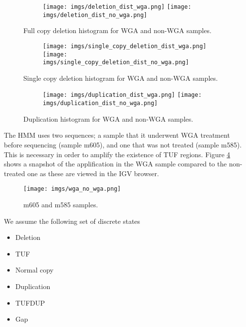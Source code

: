 \begin{figure}[h]
	\begin{subfigure}{}
		\texttt{[image: imgs/deletion\_dist\_wga.png]}
		\texttt{[image: imgs/deletion\_dist\_no\_wga.png]}	
	\end{subfigure}
	
	\caption{Full copy deletion histogram for WGA and non-WGA samples.  }
	\label{fig:image1}
\end{figure}


\begin{figure}[h]
	\begin{subfigure}{}
		\texttt{[image: imgs/single\_copy\_deletion\_dist\_wga.png]}
		\texttt{[image: imgs/single\_copy\_deletion\_dist\_no\_wga.png]}	
	\end{subfigure}
	
	\caption{Single copy deletion histogram for WGA and non-WGA samples.  }
	\label{fig:image2}
\end{figure}


\begin{figure}[h]
	\begin{subfigure}{}
		\texttt{[image: imgs/duplication\_dist\_wga.png]}
		\texttt{[image: imgs/duplication\_dist\_no\_wga.png]}	
	\end{subfigure}
	
	\caption{Duplication histogram for WGA and non-WGA samples.  }
	\label{fig:image3}
\end{figure}


The HMM uses two sequences; a sample that it underwent WGA treatment before sequencing (sample  m605), and  one that was not treated (sample m585). 
This is necessary in order to amplify the existence of TUF regions. 
Figure \ref{wga_no_wga } shows a snapshot of the applification in the WGA sample compared to the non-treated one as these are viewed in the IGV browser.


\begin{figure}[!htb]
	\begin{center}
		\texttt{[image: imgs/wga\_no\_wga.png]}
	\end{center}
	\caption{m605 and m585 samples.}
	\label{wga_no_wga }
\end{figure}

We assume the following set of discrete states 

\begin{itemize}
	\item Deletion
	\item TUF
	\item Normal copy
	\item Duplication
	\item TUFDUP
	\item Gap
\end{itemize}

